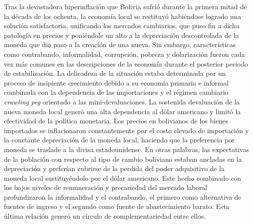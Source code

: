 \documentclass[12pt,letterpaper]{article}
\begin{document}

Tras la devastadora hiperinflación que Bolivia sufrió durante la primera mitad de la década de los ochenta, la economía local se restituyó habiéndose logrado una solución satisfactoria, unificando los mercados cambiarios, que puso fin a dicha patología en precios y poniéndole un alto a la depreciación descontrolada de la moneda que dio paso a la creación de una nueva. Sin embargo, características como contrabando, informalidad, corrupción, pobreza y dolarización fueron cada vez más comunes en las descripciones de la economía durante el posterior periodo de estabilización. La delicadeza de la situación estaba determinada por un proceso de insipiente crecimiento debido a su economía primaria e informal combinada con la dependencia de las importaciones y el régimen cambiario \emph{crawling peg} orientado a las mini-devaluaciones. La sostenida devaluación de la nueva moneda local generó una alta dependencia al dólar americano y limitó la efectividad de la política monetaria. Los precios en bolivianos de los bienes importados se inflacionaron constantemente por el costo elevado de importación y la constante depreciación de la moneda local, haciendo que la preferencia por moneda se traslade a la divisa estadounidense. En otras palabras, las expectativas de la población con respecto al tipo de cambio boliviano estaban ancladas en la depreciación y preferían cubrirse de la perdida del poder adquisitivo de la moneda local sustituyéndolo por el dólar americano. Este hecho combinado con los bajos niveles de remuneración y precariedad del mercado laboral profundizaron la informalidad y el contrabando, el primero como alternativa de fuentes de ingreso y el segundo como fuente de abastecimiento barato. Esta última relación generó un círculo de complementariedad entre ellos. 
\end{document}
